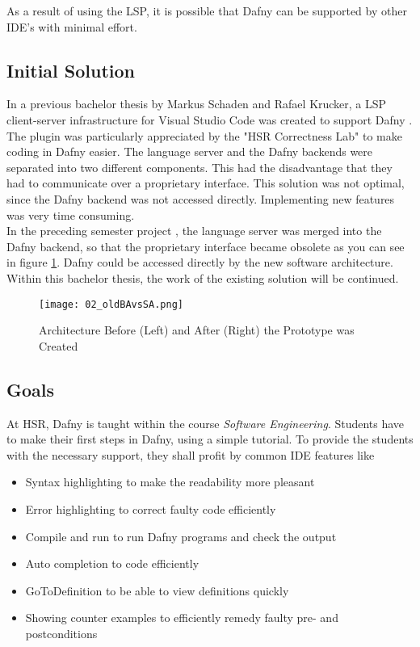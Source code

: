 As a result of using the LSP, it is possible that Dafny can be supported by other IDE's with minimal effort.

\subsection{Initial Solution}
\label{section:management_summary:initialsolution}
In a previous bachelor thesis by Markus Schaden and Rafael Krucker, a LSP client-server infrastructure for Visual Studio Code was created to support Dafny \cite{ba}.
The plugin was particularly appreciated by the "HSR Correctness Lab" \cite{correctnessLab} to make coding in Dafny easier.
The language server and the Dafny backends were separated into two different components.
This had the disadvantage that they had to communicate over a proprietary interface.
This solution was not optimal, since the Dafny backend was not accessed directly.
Implementing new features was very time consuming. \\

In the preceding semester project \cite{sa}, the language server was merged into the Dafny backend, so that the proprietary interface became obsolete as you can see in figure \ref{fig:oldBAvsSA}.
Dafny could be accessed directly by the new software architecture.
Within this bachelor thesis, the work of the existing solution will be continued.

\begin{figure}[H]
    \centering
    \texttt{[image: 02\_oldBAvsSA.png]}
    \caption{Architecture Before (Left) and After (Right) the Prototype was Created}
    \label{fig:oldBAvsSA}
\end{figure}

\subsection{Goals}
At HSR, Dafny is taught within the course \textit{Software Engineering}.
Students have to make their first steps in Dafny, using a simple tutorial.
To provide the students with the necessary support, they shall profit by common IDE features like
\begin{itemize}
    \item Syntax highlighting to make the readability more pleasant
    \item Error highlighting to correct faulty code efficiently
    \item Compile and run to run Dafny programs and check the output
    \item Auto completion to code efficiently
    \item GoToDefinition to be able to view definitions quickly
    \item Showing counter examples to efficiently remedy faulty pre- and postconditions
\end{itemize}

